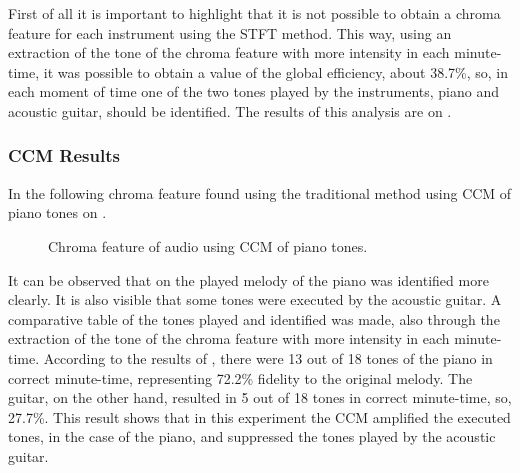 \documentclass{article}
\begin{document}
	First of all it is important to highlight that it is not possible to obtain a chroma feature for each instrument using the STFT method. This way, using an extraction of the tone of the chroma feature with more intensity in each minute-time, it was possible to obtain a value of the global efficiency, about 38.7\%, so, in each moment of time one of the two tones played by the instruments, piano and acoustic guitar, should be identified. The results of this analysis are on .

	\subsubsection{CCM Results}
	In the following chroma feature found using the traditional method using CCM of piano tones on .
	
	\begin{figure}[h!]
	 \centerline{}
	 \caption{Chroma feature of audio using CCM of piano tones.}
	 \label{fig:2-ccm-piano}
	\end{figure}	

	It can be observed that on  the played melody of the piano was identified more clearly. It is also visible that some tones were executed by the acoustic guitar. A comparative table of the tones played and identified was made, also through the extraction of the tone of the chroma feature with more intensity in each minute-time. According to the results of , there were 13 out of 18 tones of the piano in correct minute-time, representing 72.2\% fidelity to the original melody. The guitar, on the other hand, resulted in 5 out of 18 tones in correct minute-time, so, 27.7\%. This result shows that in this experiment the CCM amplified the executed tones, in the case of the piano, and suppressed the tones played by the acoustic guitar. 
\end{document}
